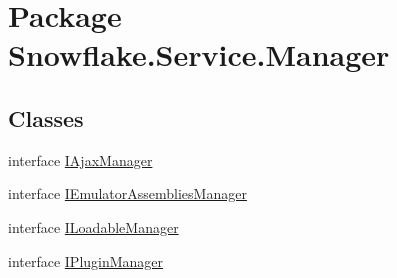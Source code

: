\hypertarget{namespace_snowflake_1_1_service_1_1_manager}{}\section{Package Snowflake.\+Service.\+Manager}
\label{namespace_snowflake_1_1_service_1_1_manager}
\subsection*{Classes}
\begin{DoxyCompactItemize}
\item 
interface \hyperlink{interface_snowflake_1_1_service_1_1_manager_1_1_i_ajax_manager}{I\+Ajax\+Manager}
\item 
interface \hyperlink{interface_snowflake_1_1_service_1_1_manager_1_1_i_emulator_assemblies_manager}{I\+Emulator\+Assemblies\+Manager}
\item 
interface \hyperlink{interface_snowflake_1_1_service_1_1_manager_1_1_i_loadable_manager}{I\+Loadable\+Manager}
\item 
interface \hyperlink{interface_snowflake_1_1_service_1_1_manager_1_1_i_plugin_manager}{I\+Plugin\+Manager}
\end{DoxyCompactItemize}
